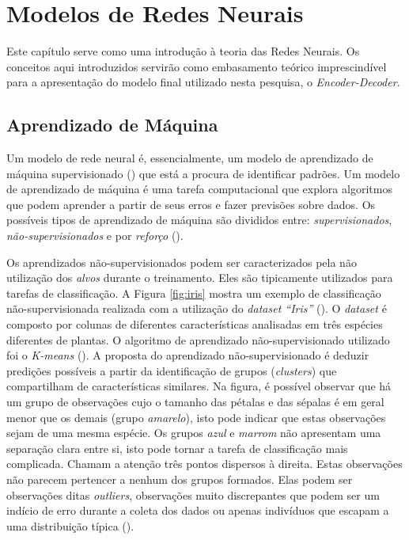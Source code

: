 \chapter{Modelos de Redes Neurais}
\label{ch:03}



Este capítulo serve como uma introdução à teoria das Redes Neurais. Os conceitos aqui introduzidos servirão como embasamento teórico imprescindível para a apresentação do modelo final utilizado nesta pesquisa, o \textit{Encoder-Decoder}. 

\section{Aprendizado de Máquina}
\label{sec:ml}

Um modelo de rede neural é, essencialmente, um modelo de aprendizado de máquina supervisionado (\cite{Goodfellow-et-al-2016})
que está a procura de identificar padrões. Um modelo de aprendizado de máquina é uma tarefa computacional que explora algoritmos que podem aprender a partir de seus erros e fazer previsões sobre dados. Os possíveis tipos de aprendizado de máquina são divididos entre: \textit{supervisionados}, \textit{não-supervisionados}
e por \textit{reforço} (\cite{Gron:2017}). 

Os aprendizados não-supervisionados podem ser caracterizados pela não utilização dos \textit{alvos} durante o treinamento. Eles são tipicamente utilizados para tarefas de classificação. A Figura \ref{fig:iris} mostra um exemplo de classificação não-supervisionada realizada com a utilização do \textit{dataset “Iris”} (\cite{Dua:2019}). O \textit{dataset} é composto por colunas de diferentes características analisadas em três espécies diferentes de plantas. O algoritmo de aprendizado não-supervisionado utilizado foi o \textit{K-means} (\cite{Shalev-Shwartz:2014:UML:2621980}). A proposta do aprendizado não-supervisionado é deduzir predições possíveis a partir da identificação de grupos (\textit{clusters}) que compartilham de características similares. Na figura, é possível observar que há um grupo de observações cujo o tamanho das pétalas e das sépalas é em geral menor que os demais (grupo \textit{amarelo}), isto pode indicar que estas observações sejam de uma mesma espécie. Os grupos \textit{azul} e \textit{marrom} não apresentam uma separação clara entre si, isto pode tornar a tarefa de classificação mais complicada. Chamam a atenção três pontos dispersos à direita. Estas observações não parecem pertencer a nenhum dos grupos formados. Elas podem ser observações ditas \textit{outliers}, observações muito discrepantes que podem ser um indício de erro durante a coleta dos dados ou apenas indivíduos que escapam a uma distribuição típica (\cite{2004:bussab}). 

